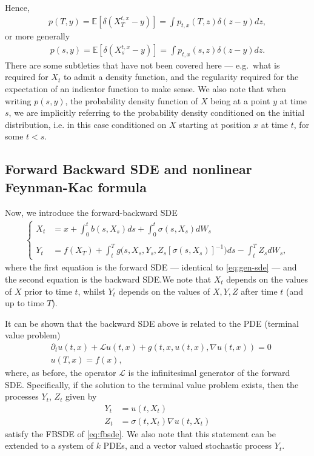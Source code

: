 \documentclass{article}  %
\begin{document}
%
Hence,
%
\begin{align}
    p(T,y) = \mathbb{E}[\delta({X_T^{t,x} - y})] = \int p_{t,x}(T,z)\delta({z-y})dz, 
\end{align} 
%
or more generally
%
\begin{align}
    p(s,y) = \mathbb{E}[\delta({X_s^{t,x} - y})] = \int p_{t,x}(s,z)\delta({z-y})dz.
\end{align} 
%
There are some subtleties that have not been covered here --- e.g.\ what is required for $X_t$ to admit a density function, and the regularity required for the expectation of an indicator function to make sense. We also note that when writing $p(s,y)$, the probability density function of $X$ being at a point $y$ at time $s$, we are implicitly referring to the probability density conditioned on the initial distribution, i.e. in this case conditioned on $X$ starting at position $x$ at time $t$, for some $t<s$.

\subsection{Forward Backward SDE and nonlinear Feynman-Kac formula}
Now, we introduce the forward-backward SDE
%
\begin{align} 
    \label{eq:fbsde}
    \begin{cases}
    X_t &= x + \int_0^t b(s,X_s) ds + \int_0^t \sigma(s,X_s)dW_s\\
    & \\
    Y_t &= f(X_T) + \int_t^T g\big(s,X_s,Y_s,Z_s[\sigma(s,X_s)]^{-1}\big)ds - \int_t^T Z_s dW_s,
    \end{cases}
\end{align}
%
where the first equation is the forward SDE --- identical to \autoref{eq:gen-sde} --- and the second equation is the backward SDE.\@ We note that $X_t$ depends on the values of $X$ prior to time $t$, whilst $Y_t$ depends on the values of $X,Y,Z$ after time $t$ (and up to time $T$). 

It can be shown that the backward SDE above is related to the PDE (terminal value problem)
%
\begin{align}
    \label{eq:nonlinear-pde}
    &\partial_t u(t,x) + \mathcal{L}u(t,x) + g(t,x,u(t,x),\nabla u(t,x)) = 0 \\
    &u(T,x) = f(x), 
\end{align} 
%
where, as before, the operator $\mathcal{L}$ is the infinitesimal generator of the forward SDE. Specifically, if the solution to the terminal value problem exists, then the processes $Y_t$, $Z_t$ given by
%
\begin{align} 
    Y_t &= u(t,X_t)\\
    Z_t &= \sigma(t,X_t) \nabla u(t,X_t)
\end{align}
%
satisfy the FBSDE of \autoref{eq:fbsde}. We also note that this statement can be extended to a system of $k$ PDEs, and a vector valued stochastic process $Y_t$. 
\end{document}
